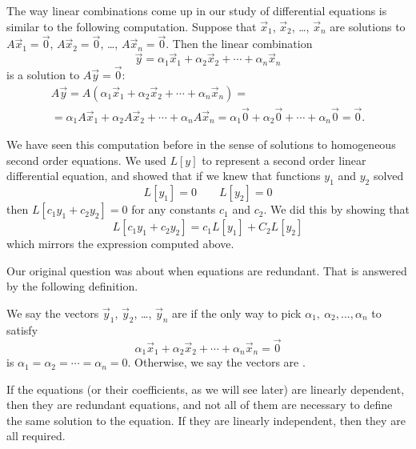 The way linear combinations come up in our study of differential
equations is similar to the following computation.  Suppose that
$\vec{x}_1$, $\vec{x}_2$, \ldots, $\vec{x}_n$ are solutions
to $A \vec{x}_1 = \vec{0}$, 
$A \vec{x}_2 = \vec{0}$, \ldots,
$A \vec{x}_n = \vec{0}$.
Then the linear combination
\begin{equation*}
\vec{y} = \alpha_1 \vec{x}_1 + 
\alpha_2 \vec{x}_2 + 
\cdots +
\alpha_n \vec{x}_n 
\end{equation*}
is a solution to $A \vec{y} = \vec{0}$:
\begin{multline*}
A \vec{y} =
A (\alpha_1 \vec{x}_1 + 
\alpha_2 \vec{x}_2 + 
\cdots +
\alpha_n \vec{x}_n )
=
\\
=
\alpha_1 A \vec{x}_1 + 
\alpha_2 A \vec{x}_2 + 
\cdots +
\alpha_n A \vec{x}_n
=
\alpha_1 \vec{0} + 
\alpha_2 \vec{0} + 
\cdots +
\alpha_n \vec{0} = \vec{0} .
\end{multline*}

We have seen this computation before in the sense of solutions to homogeneous second order equations. We used $L[y]$ to represent a second order linear differential equation, and showed that if we knew that functions $y_1$ and $y_2$ solved 
\begin{equation*}
L[y_1] = 0 \qquad L[y_2] = 0
\end{equation*}
then $L[c_1y_1 + c_2y_2] = 0$ for any constants $c_1$ and $c_2$. We did this by showing that
\begin{equation*}
L[c_1y_1 + c_2y_2] = c_1L[y_1] + C_2L[y_2]
\end{equation*}
which mirrors the expression computed above.

Our original question was about when equations are redundant. That is answered by the following definition.

\begin{definition}
We say the vectors $\vec{y}_1$, $\vec{y}_2$, \ldots, $\vec{y}_n$ are
\emph{} if the only way to pick $\alpha_1,\ \alpha_2, ..., \alpha_n$ to satisfy
\begin{equation*}
\alpha_1 \vec{x}_1 + 
\alpha_2 \vec{x}_2 + 
\cdots +
\alpha_n \vec{x}_n 
=
\vec{0}
\end{equation*}
is $\alpha_1 = \alpha_2 = \cdots = \alpha_n = 0$.
Otherwise, we say the vectors are \emph{}.
\end{definition}

If the equations (or their coefficients, as we will see later) are linearly dependent, then they are redundant equations, and not all of them are necessary to define the same solution to the equation. If they are linearly independent, then they are all required. 

